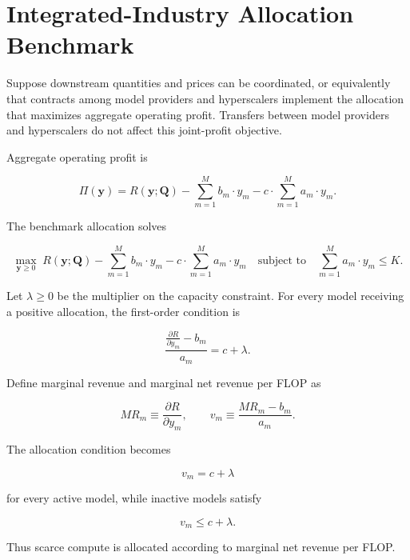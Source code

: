 \documentclass[11pt]{article}
\begin{document}
\section{Integrated-Industry Allocation Benchmark}
\label{sec:allocation}

Suppose downstream quantities and prices can be coordinated, or equivalently that contracts among model providers and hyperscalers implement the allocation that maximizes aggregate operating profit. Transfers between model providers and hyperscalers do not affect this joint-profit objective.

Aggregate operating profit is

\begin{equation}\Pi(\mathbf y)=R(\mathbf y;\mathbf Q)-\sum_{m=1}^{M}b_m\cdot y_m-c\cdot\sum_{m=1}^{M}a_m\cdot y_m.\end{equation}

The benchmark allocation solves

\begin{equation}\max_{\mathbf y\geq0}\;R(\mathbf y;\mathbf Q)-\sum_{m=1}^{M}b_m\cdot y_m-c\cdot\sum_{m=1}^{M}a_m\cdot y_m\quad\text{subject to}\quad\sum_{m=1}^{M}a_m\cdot y_m\leq K.\end{equation}

Let $\lambda\geq0$ be the multiplier on the capacity constraint. For every model receiving a positive allocation, the first-order condition is

\begin{equation}\frac{\frac{\partial R}{\partial y_m}-b_m}{a_m}=c+\lambda.\end{equation}

Define marginal revenue and marginal net revenue per FLOP as

\begin{equation}MR_m\equiv\frac{\partial R}{\partial y_m},\qquad v_m\equiv\frac{MR_m-b_m}{a_m}.\end{equation}

The allocation condition becomes

\begin{equation}\boxed{v_m=c+\lambda}\end{equation}

for every active model, while inactive models satisfy

\begin{equation}v_m\leq c+\lambda.\end{equation}

Thus scarce compute is allocated according to marginal net revenue per FLOP.
\end{document}
